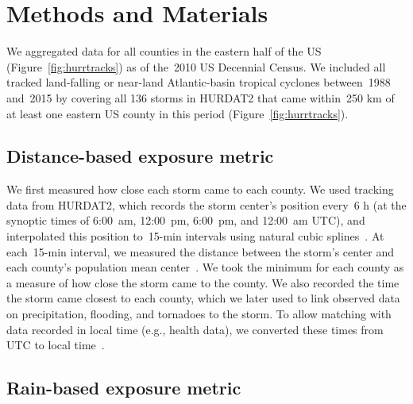 \section*{Methods and Materials}

We aggregated data for all counties in the eastern half of the \ac{US}
(Figure~\ref{fig:hurrtracks}) as of the~2010 \ac{US} Decennial Census. We
included all tracked land-falling or near-land Atlantic-basin tropical cyclones
between~1988 and~2015 by covering all 136 storms in \ac{HURDAT2}
\parencite{landsea2013} that came within~250 \si{\kilo\metre} of at least one
eastern \ac{US} county in this period (Figure~\ref{fig:hurrtracks}). 

\subsection*{Distance-based exposure metric}

We first measured how close each storm came to each county. We used tracking
data from \ac{HURDAT2}, which records the storm center's position every~6
\si{\hour} (at the synoptic times of 6:00~am, 12:00~pm, 6:00~pm, and 12:00~am
\ac{UTC}), and interpolated this position to~15-\si{\minute} intervals using
natural cubic splines~\parencite{hurricaneexposure}. At each~15-\si{\minute}
interval, we measured the distance between the storm's center and each county's
population mean center~\parencite{bivand2013applied, countycenters}. We took
the minimum for each county as a measure of how close the storm came to the
county.  We also recorded the time the storm came closest to each county, which
we later used to link observed data on precipitation, flooding, and tornadoes
to the storm.  To allow matching with data recorded in local time (e.g., health
data), we converted these times from \ac{UTC} to local
time~\parencite{countytimezones}.

\subsection*{Rain-based exposure metric}

